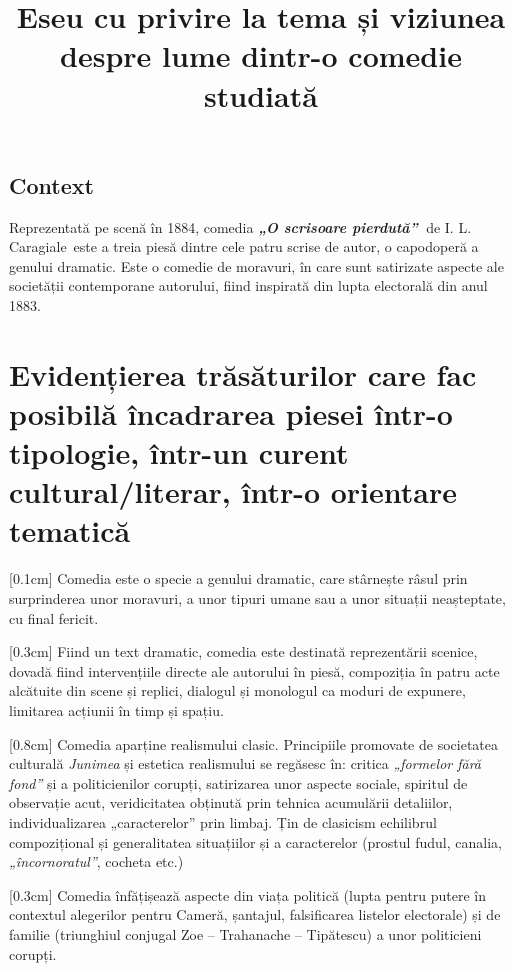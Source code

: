 \documentclass[
12pt,                        %
a4paper                      %
]{article}
\title{Eseu cu privire la tema și viziunea despre lume dintr-o comedie studiată}
\date{}   %
\author{} %
\newcommand{\operatitle}{\textbf{\textit{„O scrisoare pierdută”\ }}} %
\newcommand{\operaauthor}{I. L. Caragiale\ } %
\begin{document}
\maketitle %



\subsection{Context}

Reprezentată pe scenă în 1884, comedia \operatitle de \operaauthor este a treia piesă dintre cele patru scrise de autor, o capodoperă a genului dramatic. Este o comedie de moravuri, în care sunt satirizate aspecte ale societății contemporane autorului, fiind inspirată din lupta electorală din anul 1883.

\section{Evidențierea trăsăturilor care fac posibilă încadrarea piesei într-o tipologie, într-un curent cultural/literar, într-o orientare tematică}

[0.1cm]
Comedia este o specie a genului dramatic, care stârnește râsul prin surprinderea unor moravuri, a unor tipuri umane sau a unor situații neașteptate, cu final fericit.

[0.3cm]
Fiind un text dramatic, comedia este destinată reprezentării scenice, dovadă fiind intervențiile directe ale autorului în piesă, compoziția în patru acte alcătuite din scene și replici, dialogul și monologul ca moduri de expunere, limitarea acțiunii în timp și spațiu.

[0.8cm]
Comedia aparține realismului clasic. Principiile promovate de societatea culturală \textit{Junimea} și estetica realismului se regăsesc în: critica \textit{„formelor fără fond”} și a politicienilor corupți, satirizarea unor aspecte sociale, spiritul de observație acut, veridicitatea obținută prin tehnica acumulării detaliilor, individualizarea „caracterelor” prin limbaj. Țin de clasicism echilibrul compozițional și generalitatea situațiilor și a caracterelor (prostul fudul, canalia, \textit{„încornoratul”}, cocheta etc.)

[0.3cm]
Comedia înfățișează aspecte din viața politică (lupta pentru putere în contextul alegerilor pentru Cameră, șantajul, falsificarea listelor electorale) și de familie (triunghiul conjugal Zoe -- Trahanache -- Tipătescu) a unor politicieni corupți.
\end{document}

